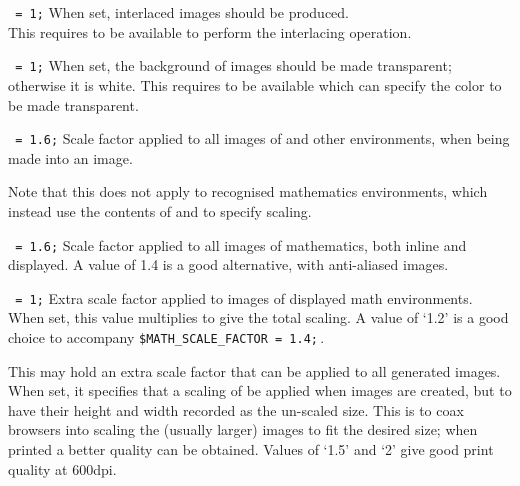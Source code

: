 \begin{htmllist}
\item [\fn{\$INTERLACE}\texttt{ = 1;}\label{interlace}]
When set, interlaced images should be produced.\\
This requires  to be available 
to perform the interlacing operation.


\item [\fn{\$TRANSPARENT\_FIGURES}\texttt{ = 1;}\label{transfigs}]
When set, the background of images should be made transparent;
otherwise it is white.\html{\\}
This requires  %
to be available which can specify the color to be made transparent.


\item [\fn{\$FIGURE\_SCALE\_FACTOR}\texttt{ = 1.6;}\label{figscale}]
Scale factor applied to all images of  and other environments, 
when being made into an image.

\smallskip\noindent
Note that this does not apply to recognised mathematics environments, 
which instead use the contents of  
and  to specify scaling.


\item [\fn{\$MATH\_SCALE\_FACTOR}\texttt{ = 1.6;}\label{mathscale}]
Scale factor applied to all images of mathematics, both inline
and displayed. 
A value of 1.4 is a good alternative, with anti-aliased images.


\item [\fn{\$DISP\_SCALE\_FACTOR}\texttt{ = 1;}\label{dispscale}]
Extra scale factor applied to images of displayed math environments.\html{\\}
When set, this value multiplies 
to give the total scaling. 
A value of `1.2' is a good choice to accompany \verb|$MATH_SCALE_FACTOR = 1.4;|\,.


\item [\fn{\$EXTRA\_IMAGE\_SCALE}\label{ximagescale}]
This may hold an extra scale factor that can be applied to all generated images.\html{\\}
When set, it specifies that a scaling of  be applied 
when images are created, but to have their height and width recorded 
as the un-scaled size. This is to coax browsers into scaling the (usually larger) 
images to fit the desired size; when printed a better quality can be obtained.
Values of `1.5' and `2' give good print quality at 600dpi.



\end{htmllist}
